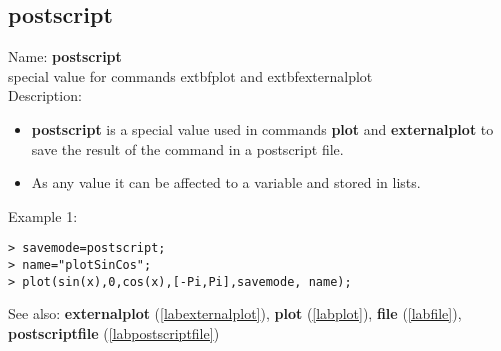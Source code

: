 \subsection{postscript}
\label{labpostscript}
\noindent Name: \textbf{postscript}\\
special value for commands 	extbf{plot} and 	extbf{externalplot}\\
\noindent Description: \begin{itemize}

\item \textbf{postscript} is a special value used in commands \textbf{plot} and \textbf{externalplot} to save
   the result of the command in a postscript file.

\item As any value it can be affected to a variable and stored in lists.
\end{itemize}
\noindent Example 1: 
\begin{center}\begin{minipage}{15cm}\begin{Verbatim}[frame=single]
> savemode=postscript;
> name="plotSinCos";
> plot(sin(x),0,cos(x),[-Pi,Pi],savemode, name);
\end{Verbatim}
\end{minipage}\end{center}
See also: \textbf{externalplot} (\ref{labexternalplot}), \textbf{plot} (\ref{labplot}), \textbf{file} (\ref{labfile}), \textbf{postscriptfile} (\ref{labpostscriptfile})
